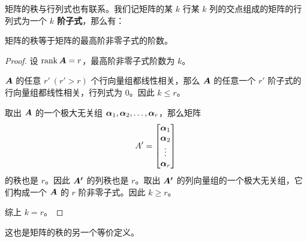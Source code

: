 矩阵的秩与行列式也有联系。我们记矩阵的某 $k$ 行某 $k$ 列的交点组成的矩阵的行列式为一个 \textbf{$k$ 阶子式}，那么有：

\begin{theorem}
	矩阵的秩等于矩阵的最高阶非零子式的阶数。

	\begin{proof}
		设 $\operatorname{rank} \boldsymbol{A} = r$，最高阶非零子式阶数为 $k$。
		
		$\boldsymbol{A}$ 的任意 $r'\ (r' > r)$ 个行向量组都线性相关，那么 $\boldsymbol{A}$ 的任意一个 $r'$ 阶子式的行向量组都线性相关，行列式为 $0$。因此 $k \le r$。

		取出 $\boldsymbol{A}$ 的一个极大无关组 $\boldsymbol{\alpha}_1, \boldsymbol{\alpha}_2, \dots, \boldsymbol{\alpha}_r$，那么矩阵
		$$
		A' = \begin{bmatrix}
			\boldsymbol{\alpha}_1 \\ \boldsymbol{\alpha}_2 \\ \vdots \\ \boldsymbol{\alpha}_r
		\end{bmatrix}
		$$
		的秩也是 $r$。因此 $\boldsymbol{A'}$ 的列秩也是 $r$。取出 $\boldsymbol{A'}$ 的列向量组的一个极大无关组，它们构成一个 $\boldsymbol{A}$ 的 $r$ 阶非零子式。因此 $k \ge r$。

		综上 $k = r$。
	\end{proof}
\end{theorem}

这也是矩阵的秩的另一个等价定义。
